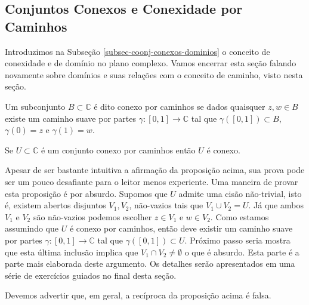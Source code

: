 \subsection{Conjuntos Conexos e Conexidade por Caminhos}

Introduzimos na Subseção \ref{subsec-coonj-conexos-dominios} 
o conceito de conexidade e de domínio no plano complexo. 
Vamos encerrar esta seção falando novamente sobre domínios 
e suas relações com o conceito de caminho, visto nesta seção.

\begin{definicao}
\label{def-conexo-caminho}
Um subconjunto $B\subset \mathbb{C}$ é dito conexo por caminhos se dados quaisquer 
$z,w\in B$ existe um caminho suave por partes $\gamma:[0,1]\to\mathbb{C}$ tal que 
$\gamma([0,1])\subset B$, $\gamma(0)=z$ e $\gamma(1)=w$.
\end{definicao}


\begin{proposicao}
Se $U\subset\mathbb{C}$ é um conjunto conexo por caminhos então $U$ é conexo.
\end{proposicao}
Apesar de ser bastante intuitiva a afirmação da proposição acima, sua prova pode ser um pouco
desafiante para o leitor menos experiente. Uma maneira de provar esta proposição é por absurdo.
Supomos que $U$ admite uma cisão não-trivial, isto é, existem abertos disjuntos $V_1,V_2$, não-vazios 
tais que $V_1\cup V_2 =U$. Já que ambos $V_1$ e $V_2$ são não-vazios podemos escolher $z\in V_1$ e $w\in V_2$.
Como estamos assumindo que $U$ é conexo por caminhos, 
então deve existir um caminho suave por partes 
$\gamma:[0,1]\to\mathbb{C}$ tal que $\gamma([0,1])\subset U$.
Próximo passo seria mostra que esta última inclusão implica que $V_1\cap V_2\neq \emptyset$
o que é absurdo. Esta parte é a parte mais elaborada deste argumento. 
Os detalhes serão apresentados em uma série de exercícios guiados no final desta seção. 


Devemos advertir que, em geral, a recíproca da proposição acima é falsa. 

